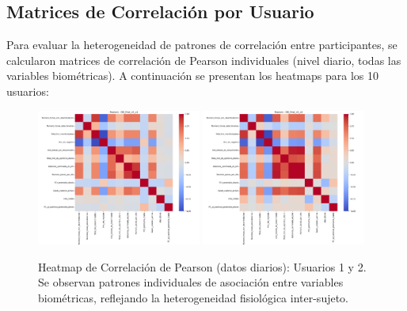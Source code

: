 \documentclass[12pt,letterpaper,twoside]{report}
\begin{document}
\subsection{Matrices de Correlación por Usuario}

Para evaluar la heterogeneidad de patrones de correlación entre participantes, se calcularon matrices de correlación de Pearson individuales (nivel diario, todas las variables biométricas). A continuación se presentan los heatmaps para los 10 usuarios:

\begin{figure}[htbp]
\centering
\includegraphics[width=0.48\textwidth]{figuras/DB_final_v3_u1_heatmap_pearson.png}
\includegraphics[width=0.48\textwidth]{figuras/DB_final_v3_u2_heatmap_pearson.png}
\caption{Heatmap de Correlación de Pearson (datos diarios): Usuarios 1 y 2. Se observan patrones individuales de asociación entre variables biométricas, reflejando la heterogeneidad fisiológica inter-sujeto.}
\label{fig:corr_heatmap_u1_u2}
\end{figure}
\end{document}
